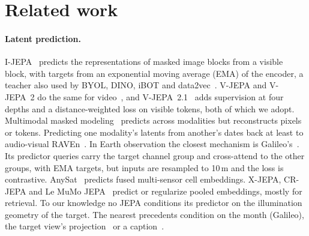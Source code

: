 \section{Related work}
\label{sec:related}

\paragraph{Latent prediction.} I-JEPA~\cite{assran2023self} predicts the representations of masked image blocks from a visible block, with targets from an exponential moving average (EMA) of the encoder, a teacher also used by BYOL, DINO, iBOT and data2vec~\cite{grill2020bootstrap,caron2021emerging,zhou2022ibot,oquab2024dinov2,baevski2022data2vec}. V-JEPA and V-JEPA~2 do the same for video~\cite{bardes2024revisiting,assran2025vjepa}, and V-JEPA~2.1~\cite{murlabadia2026vjepa} adds supervision at four depths and a distance-weighted loss on visible tokens, both of which we adopt. Multimodal masked modeling~\cite{bachmann2022multimae,mizrahi20234m} predicts across modalities but reconstructs pixels or tokens. Predicting one modality's latents from another's dates back at least to audio-visual RAVEn~\cite{haliassos2023jointly}. In Earth observation the closest mechanism is Galileo's~\cite{tseng2025galileo}. Its predictor queries carry the target channel group and cross-attend to the other groups, with EMA targets, but inputs are resampled to 10\,m and the loss is contrastive. AnySat~\cite{astruc2025anysat} predicts fused multi-sensor cell embeddings. X-JEPA, CR-JEPA and Le MuMo JEPA~\cite{choudhury2026xjepa,hossain2026crjepa,cornelissen2026mumo} predict or regularize pooled embeddings, mostly for retrieval. To our knowledge no JEPA conditions its predictor on the illumination geometry of the target. The nearest precedents condition on the month (Galileo), the target view's projection~\cite{perera2025crossjepa} or a caption~\cite{huang2026text}.

